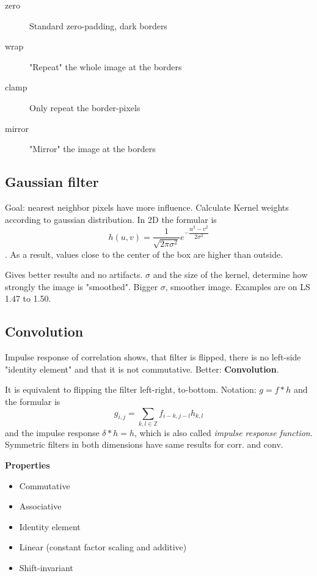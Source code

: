 \begin{description}
    \item[zero] Standard zero-padding, dark borders
    \item[wrap] "Repeat" the whole image at the borders
    \item[clamp] Only repeat the border-pixels
    \item[mirror] "Mirror" the image at the borders
\end{description}

\subsection{Gaussian filter}

Goal: nearest neighbor pixels have more influence. Calculate Kernel weights according to gaussian distribution. In 2D the formular is $$h(u,v) = \dfrac{1}{\sqrt{2\pi \sigma^2}} e^{-\dfrac{u^2 - v^2}{2\sigma^2}}$$. As a result, values close to the center of the box are higher than outside.

Gives better results and no artifacts. $\sigma$ and the size of the kernel, determine how strongly the image is "smoothed". Bigger $\sigma$, smoother image. Examples are on LS 1.47 to 1.50.

\subsection{Convolution}

Impulse response of correlation shows, that filter is flipped, there is no left-side "identity element" and that it is not commutative. Better: \textbf{Convolution}.

It is equivalent to flipping the filter left-right, to-bottom. Notation: $g = f * h$ and the formular is $$g_{i,j} = \sum\limits_{k,l \in \mathbb{Z}} f_{i-k,j-l} h_{k,l}$$ and the impulse response $\delta * h = h$, which is also called \textit{impulse response function}. Symmetric filters in both dimensions have same results for corr. and conv.

\textbf{Properties}
\begin{itemize}
    \item Commutative
    \item Associative
    \item Identity element
    \item Linear (constant factor scaling and additive)
    \item Shift-invariant
\end{itemize}

